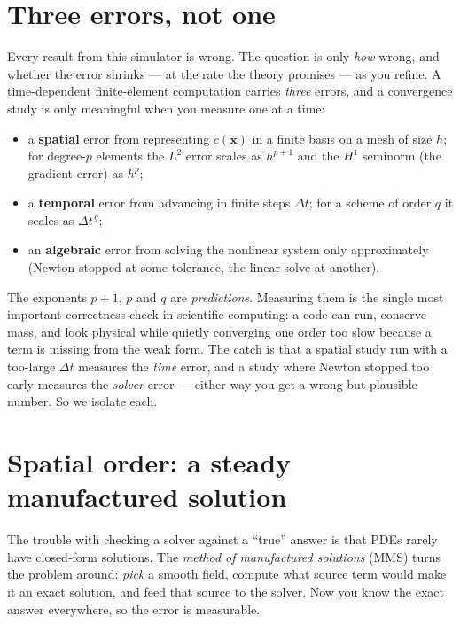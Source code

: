 \section{Three errors, not one}

Every result from this simulator is wrong. The question is only
\emph{how} wrong, and whether the error shrinks --- at the rate the
theory promises --- as you refine. A time-dependent finite-element
computation carries \emph{three} errors, and a convergence study is only
meaningful when you measure one at a time:
\begin{itemize}[nosep]
  \item a \textbf{spatial} error from representing $c(\mathbf x)$ in a
        finite basis on a mesh of size $h$; for degree-$p$ elements the
        $L^2$ error scales as $h^{p+1}$ and the $H^1$ seminorm (the
        gradient error) as $h^{p}$;
  \item a \textbf{temporal} error from advancing in finite steps
        $\Delta t$; for a scheme of order $q$ it scales as
        $\Delta t^{\,q}$;
  \item an \textbf{algebraic} error from solving the nonlinear system
        only approximately (Newton stopped at some tolerance, the linear
        solve at another).
\end{itemize}
The exponents $p+1$, $p$ and $q$ are \emph{predictions}. Measuring them
is the single most important correctness check in scientific computing:
a code can run, conserve mass, and look physical while quietly
converging one order too slow because a term is missing from the weak
form. The catch is that a spatial study run with a too-large $\Delta t$
measures the \emph{time} error, and a study where Newton stopped too
early measures the \emph{solver} error --- either way you get a
wrong-but-plausible number. So we isolate each.

\section{Spatial order: a steady manufactured solution}

The trouble with checking a solver against a ``true'' answer is that
PDEs rarely have closed-form solutions. The \emph{method of manufactured
solutions} (MMS) turns the problem around: \emph{pick} a smooth field,
compute what source term would make it an exact solution, and feed that
source to the solver. Now you know the exact answer everywhere, so the
error is measurable.

